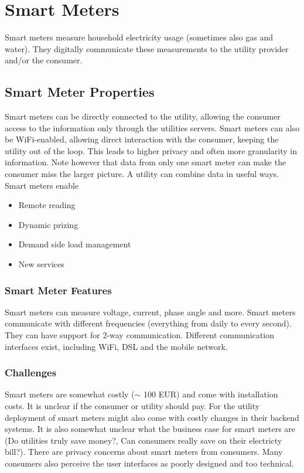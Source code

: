 \section{Smart Meters}
Smart meters measure household electricity usage (sometimes also gas and water).
They digitally communicate these measurements to the utility provider and/or the consumer.\\

\subsection{Smart Meter Properties}
Smart meters can be directly connected to the utility, allowing the consumer access to the information only through the utilities servers.
Smart meters can also be WiFi-enabled, allowing direct interaction with the consumer, keeping the utility out of the loop.
This leads to higher privacy and often more granularity in information.
Note however that data from only one smart meter can make the consumer miss the larger picture. A utility can combine data in useful ways.\\

Smart meters enable
\begin{itemize}
    \item Remote reading
    \item Dynamic prizing
    \item Demand side load management
    \item New services
\end{itemize}

\subsubsection{Smart Meter Features}
Smart meters can measure voltage, current, phase angle and more.
Smart meters communicate with different frequencies (everything from daily to every second).
They can have support for 2-way communication.
Different communication interfaces exist, including WiFi, DSL and the mobile network.

\subsubsection{Challenges}
Smart meters are somewhat costly ($\sim$ 100 EUR) and come with installation costs.
It is unclear if the consumer or utility should pay.
For the utility deployment of smart meters might also come with costly changes in their backend systems.
It is also somewhat unclear what the business case for smart meters are
(Do utilities truly save money?, Can consumers really save on their electricty bill?).
There are privacy concerns about smart meters from consumers.
Many consumers also perceive the user interfaces as poorly designed and too technical.\\

